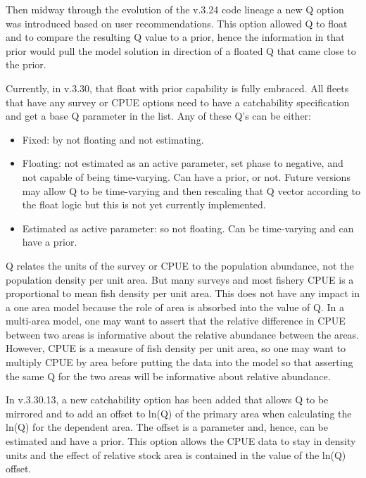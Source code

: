 Then midway through the evolution of the v.3.24 code lineage a new Q option was introduced based on user recommendations. This option allowed Q to float and to compare the resulting Q value to a prior, hence the information in that prior would pull the model solution in direction of a floated Q that came close to the prior.

Currently, in v.3.30, that float with prior capability is fully embraced. All fleets that have any survey or CPUE options need to have a catchability specification and get a base Q parameter in the list. Any of these Q's can be either:

\begin{itemize}
	\item Fixed: by not floating and not estimating.

	\item Floating: not estimated as an active parameter, set phase to negative, and not capable of being time-varying. Can have a prior, or not. Future versions may allow Q to be time-varying and then rescaling that Q vector according to the float logic but this is not yet currently implemented.

	\item Estimated as active parameter: so not floating. Can be time-varying and can have a prior.
\end{itemize}


Q relates the units of the survey or CPUE to the population abundance, not the population density per unit area. But many surveys and most fishery CPUE is a proportional to mean fish density per unit area. This does not have any impact in a one area model because the role of area is absorbed into the value of Q. In a multi-area model, one may want to assert that the relative difference in CPUE between two areas is informative about the relative abundance between the areas. However, CPUE is a measure of fish density per unit area, so one may want to multiply CPUE by area before putting the data into the model so that asserting the same Q for the two areas will be informative about relative abundance.

In v.3.30.13, a new catchability option has been added that allows Q to be mirrored and to add an offset to ln(Q) of the primary area when calculating the ln(Q) for the dependent area. The offset is a parameter and, hence, can be estimated and have a prior. This option allows the CPUE data to stay in density units and the effect of relative stock area is contained in the value of the ln(Q) offset.

